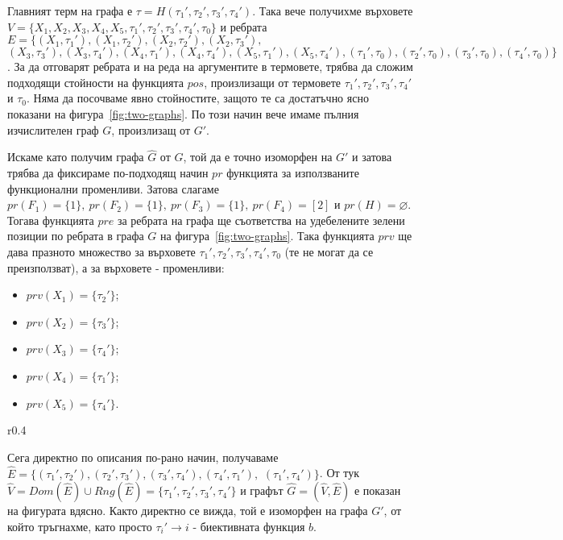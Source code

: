 \documentclass[12pt,twoside,a4paper]{article}
\begin{document}
	Главният терм на графа е $\tau=H(\tau_1',\tau_2',\tau_3',\tau_4')$. Така вече получихме върховете $V=\{X_1, X_2, X_3, X_4, X_5, \tau_1', \tau_2', \tau_3', \tau_4',\tau_0\}$ и ребрата $E=\{(X_1,\tau_1'), (X_1,\tau_2'), (X_2,\tau_2'), (X_2,\tau_3'),$ $(X_3,\tau_3'), (X_3,\tau_4'), (X_4,\tau_1'), (X_4,\tau_4'), (X_5,\tau_1'), (X_5,\tau_4'), (\tau_1',\tau_0), (\tau_2',\tau_0), (\tau_3',\tau_0), (\tau_4',\tau_0)\}$. За да отговарят ребрата и на реда на аргументите в термовете, трябва да сложим подходящи стойности на функцията $pos$, произлизащи от термовете $\tau_1', \tau_2', \tau_3', \tau_4'$ и $\tau_0$. Няма да посочваме явно стойностите, защото те са достатъчно ясно показани на фигура~\ref{fig:two-graphs}. По този начин вече имаме пълния изчислителен граф $G$, произлизащ от $G'$.
	
	Искаме като получим графа $\hat{G}$ от $G$, той да е точно изоморфен на $G'$ и затова трябва да фиксираме по-подходящ начин $pr$ функцията за използваните функционални променливи. Затова слагаме $pr(F_1)=\{1\},\ pr(F_2)=\{1\},\ pr(F_3)=\{1\},\ pr(F_4)=[2]$ и $pr(H)=\varnothing$. Тогава функцията $pre$ за ребрата на графа ще съответства на удебелените зелени позиции по ребрата в графа $G$ на фигура~\ref{fig:two-graphs}. Така функцията $prv$ ще дава празното множество за върховете $\tau_1',\tau_2',\tau_3',\tau_4',\tau_0$ (те не могат да се преизползват), а за върховете - променливи:
	\begin{itemize}
		\item $prv(X_1)=\{\tau_2'\}$;
		\item $prv(X_2)=\{\tau_3'\}$;
		\item $prv(X_3)=\{\tau_4'\}$;
		\item $prv(X_4)=\{\tau_1'\}$;
		\item $prv(X_5)=\{\tau_4'\}$.
	\end{itemize}
	
	\begin{wrapfigure}[9]{r}{0.4\textwidth}
		\vspace{-0.5cm}
		
		\label{fig:graph-ext}
	\end{wrapfigure}
	Сега директно по описания по-рано начин, получаваме $\hat{E}=\{(\tau_1',\tau_2'),(\tau_2',\tau_3'),(\tau_3',\tau_4'),(\tau_4',\tau_1'),$ $(\tau_1',\tau_4')\}$. От тук $\hat{V}=Dom(\hat{E}) \cup Rng(\hat{E})=\{\tau_1', \tau_2', \tau_3', \tau_4'\}$ и графът $\hat{G}=(\hat{V},\hat{E})$ е показан на фигурата вдясно. Както директно се вижда, той е изоморфен на графа $G'$, от който тръгнахме, като просто $\tau_i' \to i$ - биективната функция $b$.
	
\end{document}
